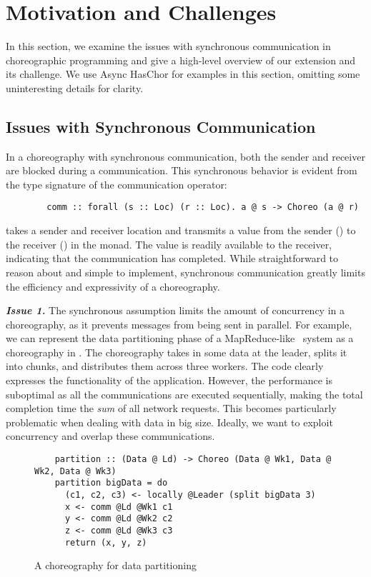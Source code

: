 \section{Motivation and Challenges}
\label{sec:motiv}

In this section, we examine the issues with synchronous communication in choreographic programming and give a high-level overview of our extension and its challenge.
%
We use Async HasChor for examples in this section, omitting some uninteresting details for clarity.

\subsection{Issues with Synchronous Communication}

In a choreography with synchronous communication, both the sender and receiver are blocked during a communication.
%
This synchronous behavior is evident from the type signature of the communication operator:
%
\begin{verbatim}
        comm :: forall (s :: Loc) (r :: Loc). a @ s -> Choreo (a @ r)
\end{verbatim}
%
 takes a sender and receiver location and transmits a value from the sender () to the receiver () in the  monad.
%
The value is readily available to the receiver, indicating that the communication has completed.
%
While straightforward to reason about and simple to implement, synchronous communication greatly limits the efficiency and expressivity of a choreography.

\textit{\textbf{Issue 1.}} The synchronous assumption limits the amount of concurrency in a choreography, as it prevents messages from being sent in parallel.
%
For example, we can represent the data partitioning phase of a MapReduce-like~\citep{map-reduce} system as a choreography in .
%
The  choreography takes in some data at the leader, splits it into chunks, and distributes them across three workers.  
%
The code clearly expresses the functionality of the application.
%
However, the performance is suboptimal as all the communications are executed sequentially, making the total completion time the \emph{sum} of all network requests.
%
This becomes particularly problematic when dealing with data in big size.
%
Ideally, we want to exploit concurrency and overlap these communications.

\begin{figure}[th]
  \begin{verbatim}
    partition :: (Data @ Ld) -> Choreo (Data @ Wk1, Data @ Wk2, Data @ Wk3)
    partition bigData = do
      (c1, c2, c3) <- locally @Leader (split bigData 3)
      x <- comm @Ld @Wk1 c1
      y <- comm @Ld @Wk2 c2
      z <- comm @Ld @Wk3 c3
      return (x, y, z)
  \end{verbatim}
  \caption{A choreography for data partitioning}
  \label{fig:partition}
\end{figure}
  
